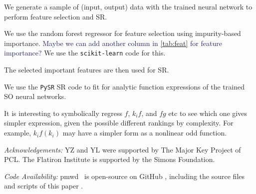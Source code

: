 \documentclass[modern, trackchanges, dvipsnames]{aastex631}
\newcommand{\pmwd}{{\usefont{T1}{nova}{m}{sl}pmwd}}
\newcommand{\YL}[1]{\textcolor{Bittersweet}{#1}}
\newcommand{\YZ}[1]{\textcolor{MidnightBlue}{#1}}
\begin{document}
We generate a sample of (input, output) data with the trained neural network to
perform feature selection and SR.

We use the random forest regressor for feature selection using impurity-based
importance.
\YZ{Maybe we can add another column in \autoref{tab:feat} for feature
importance?}
We use the \texttt{scikit-learn} \citep{scikit-learn} code for this.

The selected important features are then used for SR.

We use the \texttt{PySR} \citep{Cranmer2023} SR code to fit for analytic
function expressions of the trained SO neural networks.

\YL{It is interesting to symbolically regress $f$, $k_i f$, and $f g$
etc to see which one gives simpler expression, given the possible
different rankings by complexity.
For example, $k_i f(k_i)$ may have a simpler form as a nonlinear odd
function.}


\vspace{1em}
\textit{\large Acknowledgements:}
YZ and YL were supported by The Major Key Project of PCL.
The Flatiron Institute is supported by the Simons Foundation.


\vspace{1em}
\textit{\large Code Availability:}
\pmwd\ \citep{Li2022b} is open-source on GitHub
\href{https://github.com/eelregit/pmwd}{\faGithub}, including the source
files and scripts of this paper
\href{https://github.com/eelregit/pmwd/tree/master/docs/papers/sto}{\faFile}.








\end{document}

